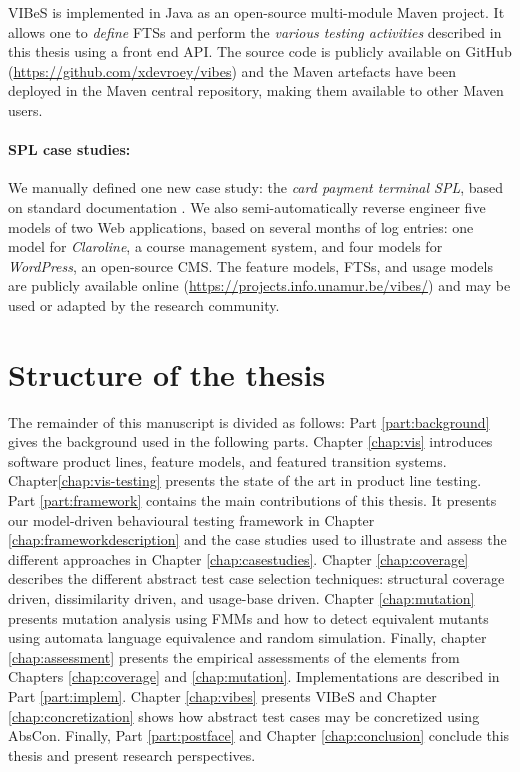 \gls{VIBeS} is implemented in Java as an open-source multi-module Maven project. It allows one to \emph{define} \glspl{FTS} and perform the \emph{various testing activities} described in this thesis using a front end \gls{API}. The source code is publicly available on GitHub (\url{https://github.com/xdevroey/vibes}) and the Maven artefacts have been deployed in the Maven central repository, making them available to other Maven users.


\paragraph{SPL case studies:}

We manually defined one new case study: the \emph{card payment terminal SPL}, based on standard documentation \cite{EMVCo2011}. We also semi-automatically reverse engineer five models of two Web applications, based on several months of log entries: one model for \emph{Claroline}, a course management system, and four models for \emph{WordPress}, an open-source \gls{CMS}. The feature models, \glspl{FTS}, and \glspl{usage model} are publicly available online (\url{https://projects.info.unamur.be/vibes/}) and may be used or adapted by the research community.


\section{Structure of the thesis}

The remainder of this manuscript is divided as follows: Part \ref{part:background} gives the background used in the following parts. Chapter \ref{chap:vis} introduces software product lines, feature models, and featured transition systems. Chapter\ref{chap:vis-testing} presents the state of the art in product line testing.
%
Part \ref{part:framework} contains the main contributions of this thesis. It presents our model-driven behavioural testing framework in Chapter \ref{chap:frameworkdescription} and the case studies used to illustrate and assess the different approaches in Chapter \ref{chap:casestudies}. Chapter \ref{chap:coverage} describes the different abstract test case selection techniques: structural coverage driven, dissimilarity driven, and usage-base driven. Chapter \ref{chap:mutation} presents mutation analysis using \glspl{FMM} and how to detect equivalent mutants using automata language equivalence and random simulation. Finally, chapter \ref{chap:assessment} presents the empirical assessments of the elements from Chapters \ref{chap:coverage} and \ref{chap:mutation}.
%
Implementations are described in Part \ref{part:implem}. Chapter \ref{chap:vibes} presents \gls{VIBeS} and Chapter \ref{chap:concretization} shows how abstract test cases may be concretized using \gls{AbsCon}.
%
Finally, Part \ref{part:postface} and Chapter \ref{chap:conclusion} conclude this thesis and present research perspectives.


